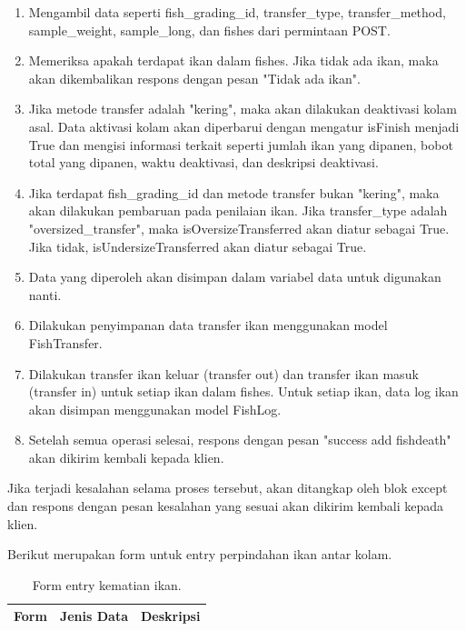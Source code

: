 \begin{enumerate}[1.]
\begin{enumerate}[(1)]
\item Mengambil data seperti fish\_grading\_id, transfer\_type, transfer\_method, sample\_weight, sample\_long, dan fishes dari permintaan POST.
\item Memeriksa apakah terdapat ikan dalam fishes. Jika tidak ada ikan, maka akan dikembalikan respons dengan pesan "Tidak ada ikan".
\item Jika metode transfer adalah "kering", maka akan dilakukan deaktivasi kolam asal. Data aktivasi kolam akan diperbarui dengan mengatur isFinish menjadi True dan mengisi informasi terkait seperti jumlah ikan yang dipanen, bobot total yang dipanen, waktu deaktivasi, dan deskripsi deaktivasi.
\item Jika terdapat fish\_grading\_id dan metode transfer bukan "kering", maka akan dilakukan pembaruan pada penilaian ikan. Jika transfer\_type adalah "oversized\_transfer", maka isOversizeTransferred akan diatur sebagai True. Jika tidak, isUndersizeTransferred akan diatur sebagai True.
\item Data yang diperoleh akan disimpan dalam variabel data untuk digunakan nanti.
\item Dilakukan penyimpanan data transfer ikan menggunakan model FishTransfer.
\item Dilakukan transfer ikan keluar (transfer out) dan transfer ikan masuk (transfer in) untuk setiap ikan dalam fishes. Untuk setiap ikan, data log ikan akan disimpan menggunakan model FishLog.
\item Setelah semua operasi selesai, respons dengan pesan "success add fishdeath" akan dikirim kembali kepada klien.
\end{enumerate}

Jika terjadi kesalahan selama proses tersebut, akan ditangkap oleh blok except dan respons dengan pesan kesalahan yang sesuai akan dikirim kembali kepada klien.

Berikut merupakan form untuk entry perpindahan ikan antar kolam.

\begin{longtable}{| l | p{5cm} | p{5cm} |}
\caption{Form entry kematian ikan.\label{table:form_entry_kematian_ikan}}\\

\hline
\multicolumn{1}{|c|}{\textbf{Form}} & \multicolumn{1}{|c|}{\textbf{Jenis Data}} & \multicolumn{1}{|c|}{\textbf{Deskripsi}}\\
\hline
\endfirsthead


\end{longtable}
\end{enumerate}
